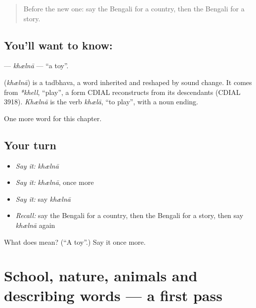 \label{lesson:BN-C89-khlna}



\begin{quote}
Before the new one: say the Bengali for a country, then the Bengali for a story.
\end{quote}

\subsection*{You'll want to know: }
\textbf{} — \emph{khælnā} — \textquotedblleft{}a toy\textquotedblright{}.

\begin{cousinweb}
\textbf{} (\emph{khælnā}) is a tadbhava, a word inherited and reshaped by sound change. It comes from \emph{*khell}, \textquotedblleft{}play\textquotedblright{}, a form CDIAL reconstructs from its descendants (CDIAL 3918). \emph{Khælnā} is the verb \emph{khælā}, \textquotedblleft{}to play\textquotedblright{}, with a noun ending.
\end{cousinweb}

\begin{grammarlens}[title={What you've built}]
One more word for this chapter.
\end{grammarlens}

\subsection*{Your turn}
\begin{itemize}
\raggedright
  \item \emph{Say it:} \emph{khælnā}
  \item \emph{Say it:} \emph{khælnā}, once more
  \item \emph{Say it:} say \emph{khælnā}
  \item \emph{Recall:} say the Bengali for a country, then the Bengali for a story, then say \emph{khælnā} again
\end{itemize}

\begin{tcolorbox}[breakable,colback=teal!4,colframe=teal!35!black,title={Before you move on}]
What does  mean? (\textquotedblleft{}A toy\textquotedblright{}.) Say it once more.
\end{tcolorbox}
\section[(dialogue)]{School, nature, animals and describing words — a first pass}

